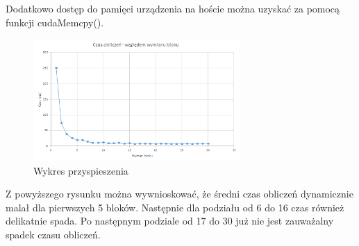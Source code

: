 \documentclass[a4paper,10pt]{article}
\begin{document}
Dodatkowo dostęp do pamięci urządzenia na hoście można uzyskać za pomocą funkcji
cudaMemcpy().
\begin{figure}[ht]
	\centering
  \includegraphics[width=0.7\textwidth]{2.png}
  \caption{Wykres przyspieszenia}
\end{figure}

Z powyższego rysunku można wywnioskować, że średni czas obliczeń dynamicznie malał dla pierwszych 5 bloków. Następnie dla podziału od 6 do 16 czas również delikatnie spada. Po następnym podziale od 17 do 30 już nie jest zauważalny spadek czasu obliczeń.
\end{document}
